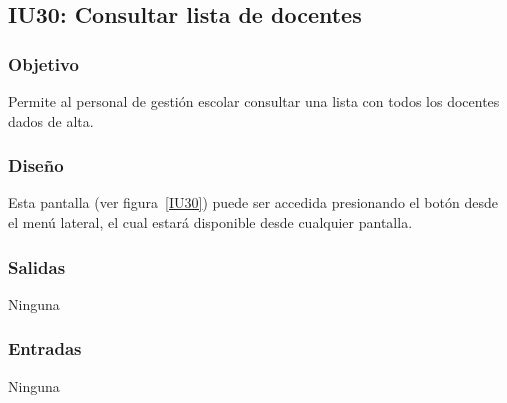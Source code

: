 
\subsection{IU30: Consultar lista de docentes}
\subsubsection{Objetivo}
   Permite al personal de gestión escolar consultar una lista con todos los docentes dados de alta.
\subsubsection{Diseño}
    Esta pantalla  (ver figura~\ref{IU30}) puede ser accedida presionando el botón  desde el menú lateral, el cual estará disponible desde cualquier pantalla.

\subsubsection{Salidas}
Ninguna
\subsubsection{Entradas}
Ninguna
